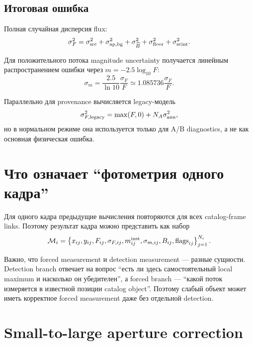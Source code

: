 \subsection{Итоговая ошибка}

Полная случайная дисперсия flux:
\begin{equation}
  \sigma_F^2=
  \sigma^2_{\rm src}
  +\sigma^2_{\rm ap,bg}
  +\sigma^2_{\widehat B}
  +\sigma^2_{\rm floor}
  +\sigma^2_{\rm scint}.
  \label{eq:flux-error-total}
\end{equation}

Для положительного потока magnitude uncertainty получается линейным распространением ошибки через $m=-2.5\log_{10}F$:
\begin{equation}
  \sigma_m=\frac{2.5}{\ln 10}\frac{\sigma_F}{F}
  \simeq1.085736\frac{\sigma_F}{F}.
  \label{eq:mag-error}
\end{equation}

Параллельно для provenance вычисляется legacy-модель
\begin{equation}
  \sigma^2_{F,\rm legacy}
  =\max(F,0)+N_A\sigma_{\rm ann}^2,
\end{equation}
но в нормальном режиме она используется только для A/B diagnostics, а не как основная физическая ошибка.

\section{Что означает ``фотометрия одного кадра''}

Для одного кадра предыдущие вычисления повторяются для всех catalog-frame links. Поэтому результат кадра можно представить как набор
\begin{equation}
  \mathcal{M}_i=
  \left\{
  x_{ij},y_{ij},F_{ij},\sigma_{F,ij},
  m^{\rm inst}_{ij},\sigma_{m,ij},B_{ij},\mathrm{flags}_{ij}
  \right\}_{j=1}^{N_i}.
\end{equation}

Важно, что forced measurement и detection measurement --- разные сущности. Detection branch отвечает на вопрос ``есть ли здесь самостоятельный local maximum и насколько он убедителен'', а forced branch --- ``какой поток измеряется в известной позиции catalog object''. Поэтому слабый объект может иметь корректное forced measurement даже без отдельной detection.

\section{Small-to-large aperture correction}
\label{sec:aperture-correction-math}


